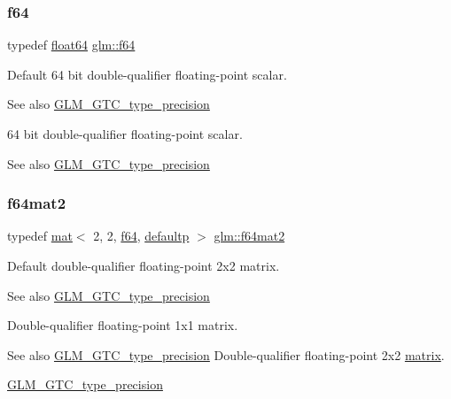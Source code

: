 \subsubsection{\texorpdfstring{f64}{f64}}
{\footnotesize\ttfamily typedef \hyperlink{group__gtc__type__precision_gab721f828b41f46b20cf4883b50733d3b}{float64} \hyperlink{group__gtc__type__precision_ga2bba392e555124b36cde6abba349bab3}{glm\+::f64}}

Default 64 bit double-\/qualifier floating-\/point scalar. \begin{DoxySeeAlso}{See also}
\hyperlink{group__gtc__type__precision}{G\+L\+M\+\_\+\+G\+T\+C\+\_\+type\+\_\+precision}
\end{DoxySeeAlso}
64 bit double-\/qualifier floating-\/point scalar. \begin{DoxySeeAlso}{See also}
\hyperlink{group__gtc__type__precision}{G\+L\+M\+\_\+\+G\+T\+C\+\_\+type\+\_\+precision} 
\end{DoxySeeAlso}
\mbox{\label{group__gtc__type__precision_ga477d3143dab8df258829c0eaf3067770}} 
\subsubsection{\texorpdfstring{f64mat2}{f64mat2}}
{\footnotesize\ttfamily typedef \hyperlink{structglm_1_1mat}{mat}$<$ 2, 2, \hyperlink{group__gtc__type__precision_ga2bba392e555124b36cde6abba349bab3}{f64}, \hyperlink{namespaceglm_a36ed105b07c7746804d7fdc7cc90ff25a9d21ccd8b5a009ec7eb7677befc3bf51}{defaultp} $>$ \hyperlink{group__gtc__type__precision_ga477d3143dab8df258829c0eaf3067770}{glm\+::f64mat2}}

Default double-\/qualifier floating-\/point 2x2 matrix. \begin{DoxySeeAlso}{See also}
\hyperlink{group__gtc__type__precision}{G\+L\+M\+\_\+\+G\+T\+C\+\_\+type\+\_\+precision}
\end{DoxySeeAlso}
Double-\/qualifier floating-\/point 1x1 matrix. \begin{DoxySeeAlso}{See also}
\hyperlink{group__gtc__type__precision}{G\+L\+M\+\_\+\+G\+T\+C\+\_\+type\+\_\+precision} Double-\/qualifier floating-\/point 2x2 \hyperlink{_s_d_l__opengl__glext_8h_a7b24a3f2f56eb1244ae69dacb4fecb6f}{matrix}. 

\hyperlink{group__gtc__type__precision}{G\+L\+M\+\_\+\+G\+T\+C\+\_\+type\+\_\+precision} 
\end{DoxySeeAlso}
\mbox{\label{group__gtc__type__precision_gae18de078e2885803ceda215c6e04a08a}} 
